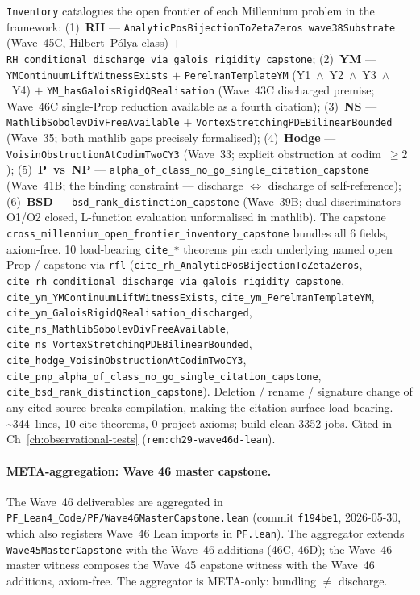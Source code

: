 \begin{itemize}
  \texttt{Inventory} catalogues the open frontier of each Millennium
  problem in the framework: (1)~\textbf{RH} ---
  \texttt{AnalyticPosBijectionToZetaZeros wave38Substrate} (Wave~45C,
  Hilbert--P\'olya-class) $+$
  \texttt{RH\_conditional\_discharge\_via\_galois\_rigidity\_capstone};
  (2)~\textbf{YM} --- \texttt{YMContinuumLiftWitnessExists} $+$
  \texttt{PerelmanTemplateYM} (Y1~$\wedge$~Y2~$\wedge$~Y3~$\wedge$~Y4)
  $+$ \texttt{YM\_hasGaloisRigidQRealisation} (Wave~43C discharged
  premise; Wave~46C single-Prop reduction available as a fourth
  citation); (3)~\textbf{NS} --- \texttt{MathlibSobolevDivFreeAvailable}
  $+$ \texttt{VortexStretchingPDEBilinearBounded} (Wave~35; both
  mathlib gaps precisely formalised); (4)~\textbf{Hodge} ---
  \texttt{VoisinObstructionAtCodimTwoCY3} (Wave~33; explicit
  obstruction at codim~$\geq 2$); (5)~\textbf{P~vs~NP} ---
  \texttt{alpha\_of\_class\_no\_go\_single\_citation\_capstone}
  (Wave~41B; the binding constraint --- discharge $\Leftrightarrow$
  discharge of self-reference); (6)~\textbf{BSD} ---
  \texttt{bsd\_rank\_distinction\_capstone} (Wave~39B; dual
  discriminators O1/O2 closed, L-function evaluation unformalised
  in mathlib). The capstone
  \texttt{cross\_millennium\_open\_frontier\_inventory\_capstone}
  bundles all 6 fields, axiom-free. 10 load-bearing \texttt{cite\_*}
  theorems pin each underlying named open Prop / capstone via
  \texttt{rfl} (\texttt{cite\_rh\_AnalyticPosBijectionToZetaZeros},
  \texttt{cite\_rh\_conditional\_discharge\_via\_galois\_rigidity\_capstone},
  \texttt{cite\_ym\_YMContinuumLiftWitnessExists},
  \texttt{cite\_ym\_PerelmanTemplateYM},
  \texttt{cite\_ym\_GaloisRigidQRealisation\_discharged},
  \texttt{cite\_ns\_MathlibSobolevDivFreeAvailable},
  \texttt{cite\_ns\_VortexStretchingPDEBilinearBounded},
  \texttt{cite\_hodge\_VoisinObstructionAtCodimTwoCY3},
  \texttt{cite\_pnp\_alpha\_of\_class\_no\_go\_single\_citation\_capstone},
  \texttt{cite\_bsd\_rank\_distinction\_capstone}). Deletion / rename
  / signature change of any cited source breaks compilation, making
  the citation surface load-bearing.
  \textasciitilde 344~lines, 10 cite theorems, 0 project axioms;
  build clean 3352 jobs. Cited in
  Ch~\ref{ch:observational-tests} (\texttt{rem:ch29-wave46d-lean}).
\end{itemize}

\paragraph{META-aggregation: Wave 46 master capstone.} The Wave~46
deliverables are aggregated in
\texttt{PF\_Lean4\_Code/PF/Wave46MasterCapstone.lean} (commit
\texttt{f194be1}, 2026-05-30, which also registers Wave~46 Lean
imports in \texttt{PF.lean}). The aggregator extends
\texttt{Wave45MasterCapstone} with the Wave~46 additions (46C, 46D);
the Wave~46 master witness composes the Wave~45 capstone witness
with the Wave~46 additions, axiom-free. The aggregator is
META-only: bundling $\neq$ discharge.


